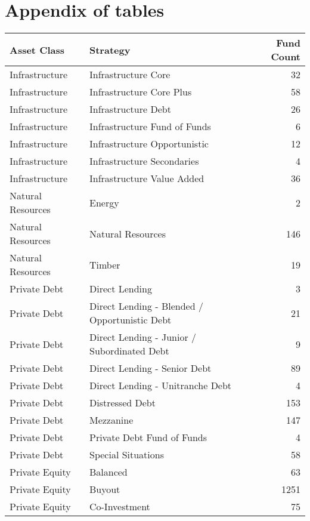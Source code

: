 
\section{Appendix of tables}


\begin{table}[ht]
	\centering
	\begin{tabular}{llr}
		\hline
		Asset Class & Strategy & Fund Count \\ 
		\hline
		Infrastructure & Infrastructure Core &   32 \\ 
		Infrastructure & Infrastructure Core Plus &   58 \\ 
		Infrastructure & Infrastructure Debt &   26 \\ 
		Infrastructure & Infrastructure Fund of Funds &    6 \\ 
		Infrastructure & Infrastructure Opportunistic &   12 \\ 
		Infrastructure & Infrastructure Secondaries &    4 \\ 
		Infrastructure & Infrastructure Value Added &   36 \\ 
		\hline
		Natural Resources & Energy &    2 \\ 
		Natural Resources & Natural Resources &  146 \\ 
		Natural Resources & Timber &   19 \\ 
		\hline
		Private Debt & Direct Lending &    3 \\ 
		Private Debt & Direct Lending - Blended / Opportunistic Debt &   21 \\ 
		Private Debt & Direct Lending - Junior / Subordinated Debt &    9 \\ 
		Private Debt & Direct Lending - Senior Debt &   89 \\ 
		Private Debt & Direct Lending - Unitranche Debt &    4 \\ 
		Private Debt & Distressed Debt &  153 \\ 
		Private Debt & Mezzanine &  147 \\ 
		Private Debt & Private Debt Fund of Funds &    4 \\ 
		Private Debt & Special Situations &   58 \\ 
		\hline
		Private Equity & Balanced &   63 \\ 
		Private Equity & Buyout & 1251 \\ 
		Private Equity & Co-Investment &   75 \\ 

\end{tabular}
\end{table}
